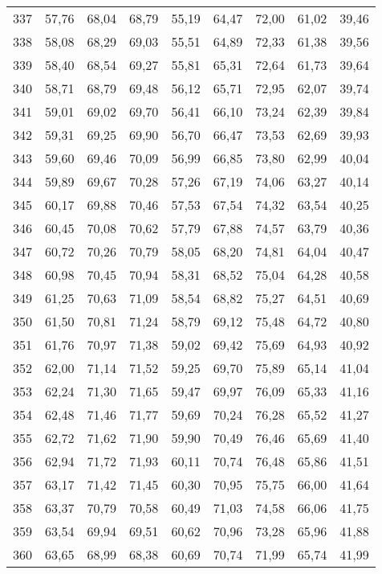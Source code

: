 \begin{longtable}{c c c c c c c c c}
337	& 57,76	& 68,04	& 68,79	& 55,19	& 64,47	& 72,00	& 61,02	& 39,46 \\
338	& 58,08	& 68,29	& 69,03	& 55,51	& 64,89	& 72,33	& 61,38	& 39,56 \\
339	& 58,40	& 68,54	& 69,27	& 55,81	& 65,31	& 72,64	& 61,73	& 39,64 \\
340	& 58,71	& 68,79	& 69,48	& 56,12	& 65,71	& 72,95	& 62,07	& 39,74 \\
341	& 59,01	& 69,02	& 69,70	& 56,41	& 66,10	& 73,24	& 62,39	& 39,84 \\
342	& 59,31	& 69,25	& 69,90	& 56,70	& 66,47	& 73,53	& 62,69	& 39,93 \\
343	& 59,60	& 69,46	& 70,09	& 56,99	& 66,85	& 73,80	& 62,99	& 40,04 \\
344	& 59,89	& 69,67	& 70,28	& 57,26	& 67,19	& 74,06	& 63,27	& 40,14 \\
345	& 60,17	& 69,88	& 70,46	& 57,53	& 67,54	& 74,32	& 63,54	& 40,25 \\
346	& 60,45	& 70,08	& 70,62	& 57,79	& 67,88	& 74,57	& 63,79	& 40,36 \\
347	& 60,72	& 70,26	& 70,79	& 58,05	& 68,20	& 74,81	& 64,04	& 40,47 \\
348	& 60,98	& 70,45	& 70,94	& 58,31	& 68,52	& 75,04	& 64,28	& 40,58 \\
349	& 61,25	& 70,63	& 71,09	& 58,54	& 68,82	& 75,27	& 64,51	& 40,69 \\
350	& 61,50	& 70,81	& 71,24	& 58,79	& 69,12	& 75,48	& 64,72	& 40,80 \\
351	& 61,76	& 70,97	& 71,38	& 59,02	& 69,42	& 75,69	& 64,93	& 40,92 \\
352	& 62,00	& 71,14	& 71,52	& 59,25	& 69,70	& 75,89	& 65,14	& 41,04 \\
353	& 62,24	& 71,30	& 71,65	& 59,47	& 69,97	& 76,09	& 65,33	& 41,16 \\
354	& 62,48	& 71,46	& 71,77	& 59,69	& 70,24	& 76,28	& 65,52	& 41,27 \\
355	& 62,72	& 71,62	& 71,90	& 59,90	& 70,49	& 76,46	& 65,69	& 41,40 \\
356	& 62,94	& 71,72	& 71,93	& 60,11	& 70,74	& 76,48	& 65,86	& 41,51 \\
357	& 63,17	& 71,42	& 71,45	& 60,30	& 70,95	& 75,75	& 66,00	& 41,64 \\
358	& 63,37	& 70,79	& 70,58	& 60,49	& 71,03	& 74,58	& 66,06	& 41,75 \\
359	& 63,54	& 69,94	& 69,51	& 60,62	& 70,96	& 73,28	& 65,96	& 41,88 \\
360	& 63,65	& 68,99	& 68,38	& 60,69	& 70,74	& 71,99	& 65,74	& 41,99 \\

\end{longtable}
